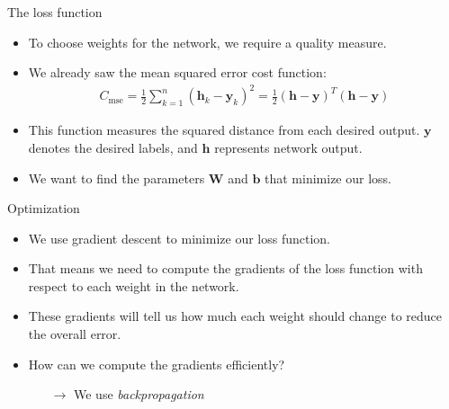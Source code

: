 \documentclass{beamer}
\begin{document}
    \begin{frame}{The loss function}
		\begin{itemize}
      \item To choose weights for the network, we require a quality measure.
      \item We already saw the mean squared error cost function:
      \begin{align}
        C_{\text{mse}} = \frac{1}{2} \sum_{k=1}^{n} (\mathbf{h}_k - \mathbf{y}_k)^2 = \frac{1}{2} (\mathbf{h} - \mathbf{y})^T(\mathbf{h} - \mathbf{y})
      \end{align}
      \item This function measures the squared distance from each desired output.
      $\mathbf{y}$ denotes the desired labels, and $\mathbf{h}$ represents network output.  %
			\item We want to find the parameters $\mathbf{W}$ and $\mathbf{b}$ that minimize our loss. 
			\end{itemize}
    \end{frame}
		
		\begin{frame}{Optimization}
      \begin{itemize}
      \item We use gradient descent to minimize our loss function.
			\item That means we need to compute the gradients of the loss function with respect to each weight in the network. 
			\item These gradients will tell us how much each weight should change to reduce the overall error. %
			\item How can we compute the gradients efficiently? %
			\begin{itemize}
				\item[$\rightarrow$] We use \emph{backpropagation}
			\end{itemize}
			\end{itemize}
    \end{frame}
		
\end{document}
